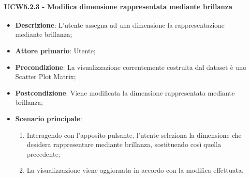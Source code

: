 \paragraph{UCW5.2.3 - Modifica dimensione rappresentata mediante brillanza}
\label{par:ucw5.2.3}
\begin{itemize}

    \item \textbf{Descrizione}:     L'utente assegna ad una dimensione la rappresentazione mediante brillanza;
    \item \textbf{Attore primario}: Utente;
    \item \textbf{Precondizione}:   La visualizzazione correntemente costruita dal dataset è uno Scatter Plot Matrix;
    \item \textbf{Postcondizione}:  Viene modificata la dimensione rappresentata mediante brillanza;
    \item \textbf{Scenario principale}:
          \begin{enumerate}
              \item   Interagendo con l'apposito pulsante, l'utente seleziona la dimensione che desidera rappresentare
                    mediante brillanza, sostituendo così quella precedente;

              \item   La visualizzazione viene aggiornata in accordo con la modifica effettuata.
          \end{enumerate}
\end{itemize}

